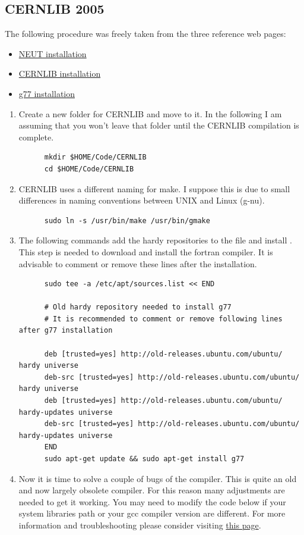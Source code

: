 \subsection{CERNLIB 2005}
The following procedure was freely taken from the three reference web
pages:
\begin{itemize}
\item
  \href{https://www.t2k.org/asg/xsec/niwgdocs/neut/install_neut}{NEUT
    installation}
\item
  \href{https://www-zeuthen.desy.de/linear_collider/cernlib/new/cernlib_2005.html}%
  {CERNLIB installation }
\item
  \href{http://seanelvidge.com/2017/01/install-g77-on-ubuntu-14-04/}{g77
    installation}
\end{itemize}
\begin{enumerate}[resume]
\item Create a new folder for CERNLIB and move to it. In the following
  I am assuming that you won't leave that folder until the CERNLIB
  compilation is complete.
\begin{lstlisting}
      mkdir $HOME/Code/CERNLIB
      cd $HOME/Code/CERNLIB
\end{lstlisting}
\item CERNLIB uses a different naming for make. I suppose this is due
  to small differences in naming conventions between UNIX and Linux
  (g-nu).%
\begin{lstlisting}
      sudo ln -s /usr/bin/make /usr/bin/gmake
\end{lstlisting}
\item The following commands add the hardy repositories to the
   file and install . This
  step is needed to download and install the fortran 
  compiler. It is advisable to comment or remove these lines after the
   installation.%
\begin{lstlisting}
      sudo tee -a /etc/apt/sources.list << END

      # Old hardy repository needed to install g77
      # It is recommended to comment or remove following lines after g77 installation
      
      deb [trusted=yes] http://old-releases.ubuntu.com/ubuntu/ hardy universe
      deb-src [trusted=yes] http://old-releases.ubuntu.com/ubuntu/ hardy universe
      deb [trusted=yes] http://old-releases.ubuntu.com/ubuntu/ hardy-updates universe
      deb-src [trusted=yes] http://old-releases.ubuntu.com/ubuntu/ hardy-updates universe
      END
      sudo apt-get update && sudo apt-get install g77
\end{lstlisting}
\item Now it is time to solve a couple of bugs of the 
  compiler. This is quite an old and now largely obsolete
  compiler. For this reason many adjustments are needed to get it
  working. You may need to modify the code below if your system libraries
  path or your gcc compiler version are different. For more
  information and troubleshooting please consider visiting
  \href{http://seanelvidge.com/2017/01/install-g77-on-ubuntu-14-04/}{this
    page}.


\end{enumerate}
